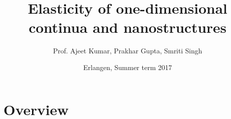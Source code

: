 \documentclass[t]{beamer}
\title[]{Elasticity of one-dimensional continua and nanostructures}
\author{Prof. Ajeet Kumar, Prakhar Gupta, Smriti Singh}
\date{Erlangen, Summer term 2017}
\institute{Chair of Applied Mechanics}
\begin{document}
\frame[plain,c]{\titlepage}







\section*{Overview}

\frame{
  \tableofcontents
}









%



\end{document}
